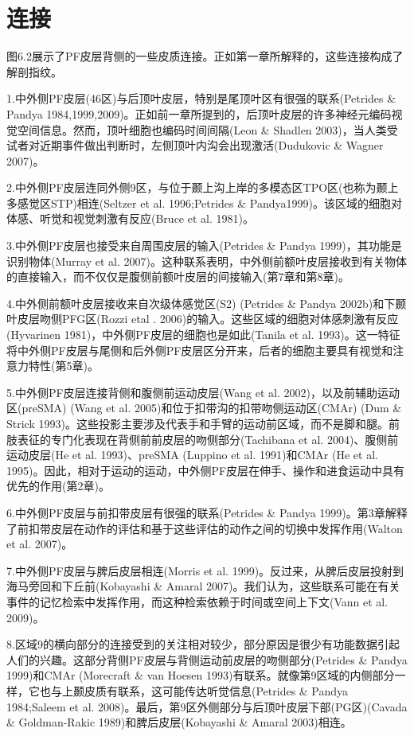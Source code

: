 \section{连接}
图6.2展示了PF皮层背侧的一些皮质连接。正如第一章所解释的，这些连接构成了解剖指纹。
\par
1.中外侧PF皮层(46区)与后顶叶皮层，特别是尾顶叶区有很强的联系(Petrides \& Pandya 1984,1999,2009)。正如前一章所提到的，后顶叶皮层的许多神经元编码视觉空间信息。然而，顶叶细胞也编码时间间隔(Leon \& Shadlen 2003)，当人类受试者对近期事件做出判断时，左侧顶叶内沟会出现激活(Dudukovic \& Wagner 2007)。
\par
2.中外侧PF皮层连同外侧9区，与位于颞上沟上岸的多模态区TPO区(也称为颞上多感觉区STP)相连(Seltzer et al. 1996;Petrides \& Pandya1999)。该区域的细胞对体感、听觉和视觉刺激有反应(Bruce et al. 1981)。
\par
3.中外侧PF皮层也接受来自周围皮层的输入(Petrides \& Pandya 1999)，其功能是识别物体(Murray et al. 2007)。这种联系表明，中外侧前额叶皮层接收到有关物体的直接输入，而不仅仅是腹侧前额叶皮层的间接输入(第7章和第8章)。
\par
4.中外侧前额叶皮层接收来自次级体感觉区(S2) (Petrides \& Pandya 2002b)和下颞叶皮层吻侧PFG区(Rozzi etal . 2006)的输入。这些区域的细胞对体感刺激有反应(Hyvarinen 1981)，中外侧PF皮层的细胞也是如此(Tanila et al. 1993)。这一特征将中外侧PF皮层与尾侧和后外侧PF皮层区分开来，后者的细胞主要具有视觉和注意力特性(第5章)。
\par
5.中外侧PF皮层连接背侧和腹侧前运动皮层(Wang et al. 2002)，以及前辅助运动区(preSMA) (Wang et al. 2005)和位于扣带沟的扣带吻侧运动区(CMAr) (Dum \& Strick 1993)。这些投影主要涉及代表手和手臂的运动前区域，而不是脚和腿。前肢表征的专门化表现在背侧前前皮层的吻侧部分(Tachibana et al. 2004)、腹侧前运动皮层(He et al. 1993)、preSMA (Luppino et al. 1991)和CMAr (He et al. 1995)。因此，相对于运动的运动，中外侧PF皮层在伸手、操作和进食运动中具有优先的作用(第2章)。
\par
6.中外侧PF皮层与前扣带皮层有很强的联系(Petrides \& Pandya 1999)。第3章解释了前扣带皮层在动作的评估和基于这些评估的动作之间的切换中发挥作用(Walton et al. 2007)。
\par
7.中外侧PF皮层与脾后皮层相连(Morris et al. 1999)。反过来，从脾后皮层投射到海马旁回和下丘前(Kobayashi \& Amaral 2007)。我们认为，这些联系可能在有关事件的记忆检索中发挥作用，而这种检索依赖于时间或空间上下文(Vann et al. 2009)。
\par
8.区域9的横向部分的连接受到的关注相对较少，部分原因是很少有功能数据引起人们的兴趣。这部分背侧PF皮层与背侧运动前皮层的吻侧部分(Petrides \& Pandya 1999)和CMAr (Morecraft \& van Hoesen 1993)有联系。就像第9区域的内侧部分一样，它也与上颞皮质有联系，这可能传达听觉信息(Petrides \& Pandya 1984;Saleem et al. 2008)。最后，第9区外侧部分与后顶叶皮层下部(PG区)(Cavada \& Goldman-Rakic 1989)和脾后皮层(Kobayashi \& Amaral 2003)相连。
